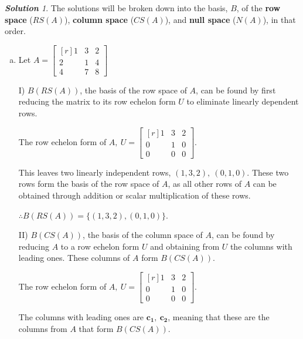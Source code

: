 \documentclass[12pt, letterpaper]{article}
\theoremstyle{remark}
\theoremstyle{remark}
\newtheorem*{solution}{\textbf{Solution}}
\begin{document}
\begin{solution}

	The solutions will be broken down into the basis, $B$, of
	the \textbf{row space} ($RS(A)$), \textbf{column space} ($CS(A)$), and
	\textbf{null space} ($N(A)$), in that
	order.

	\begin{enumerate}[(a)]
		\item Let \( A =
		      \begin{bmatrix*}[r]
			      1 & 3 & 2 \\
			      2 & 1 & 4 \\
			      4 & 7 & 8
		      \end{bmatrix*}
		      \)

		      \bigskip

		      I) \(B(RS(A))\), the basis of the row space of $A$, can be found by
		      first reducing the matrix to its row echelon form $U$ to
		      eliminate linearly dependent rows.

		      The row echelon form of \(A,\ U =
		      \begin{bmatrix*}[r]
			      1 & 3 & 2 \\
			      0 & 1 & 0 \\
			      0 & 0 & 0
		      \end{bmatrix*}
		      \).

		      This leaves two linearly independent rows, \((1, 3, 2),\ (0, 1, 0)\).
		      These two rows form the basis of the row space of $A$, as all other
		      rows of $A$ can be obtained through addition or scalar multiplication
		      of these rows.

		      \(\therefore B(RS(A)) = \{(1, 3, 2),(0, 1, 0)\}\).

		      \pagebreak

		      II) \(B(CS(A))\), the basis of the column space of $A$, can be found
		      by reducing $A$ to a row echelon form $U$ and obtaining from $U$ the
		      columns with leading ones. These columns of $A$ form \(B(CS(A))\).

		      The row echelon form of \(A,\ U =
		      \begin{bmatrix*}[r]
			      1 & 3 & 2 \\
			      0 & 1 & 0 \\
			      0 & 0 & 0
		      \end{bmatrix*}
		      \).

		      The columns with leading ones are \(\bm{c_1},\ \bm{c_2}\), meaning
		      that these are the columns from \(A\) that form \(B(CS(A))\).


\end{enumerate}
\end{solution}
\end{document}

